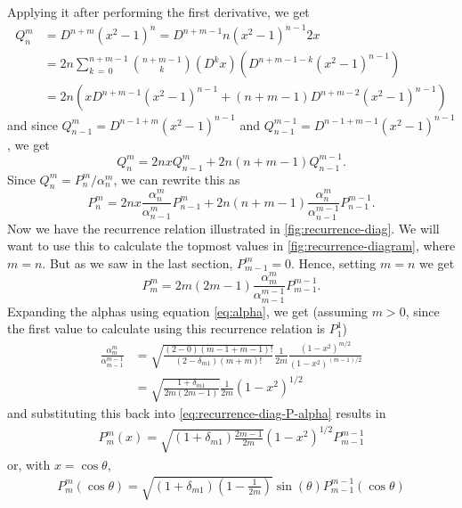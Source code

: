 \documentclass[12pt]{article}
\begin{document}
Applying it after performing the first derivative, we get
\begin{align}
  Q_n^m &= D^{n+m}(x^2 - 1)^n = D^{n + m - 1}n(x^2 - 1)^{n-1}2x\\ 
  &= 2n\sum_{k\,=\,0}^{n+m-1}{n+m-1\choose k}\left(D^k x\right)\left(D^{n+m-1-k}(x^2 - 1)^{n-1}\right)\\ 
  &= 2n\left(xD^{n+m-1}(x^2 - 1)^{n-1} + (n+m-1)D^{n+m-2}(x^2-1)^{n-1}\right)
\end{align}
and since $Q_{n-1}^{m} = D^{n-1+m}(x^2-1)^{n-1}$ and $Q_{n-1}^{m-1}=D^{n-1+m-1}(x^2-1)^{n-1}$, we get
\begin{equation}\label{eq:recurrence-diag-Q}
  Q_n^m = 2nxQ_{n-1}^m + 2n(n+m-1)Q_{n-1}^{m-1}.
\end{equation}
Since $Q_n^m=P_n^m/\alpha_n^m$, we can rewrite this as 
\begin{equation}
  P_n^m = 2nx\frac{\alpha_n^m}{\alpha_{n-1}^m}P_{n-1}^m + 2n(n+m-1)\frac{\alpha_n^m}{\alpha_{n-1}^{m-1}}P_{n-1}^{m-1}.
\end{equation}
Now we have the recurrence relation illustrated in \autoref{fig:recurrence-diag}. We will want to use this to calculate the topmost values in \autoref{fig:recurrence-diagram}, where $m=n$. But as we saw in the last section, $P_{m-1}^m = 0$. Hence, setting $m = n$ we get 
\begin{equation}\label{eq:recurrence-diag-P-alpha}
  P_m^m = 2m(2m-1)\frac{\alpha_m^m}{\alpha_{m-1}^{m-1}}P_{m-1}^{m-1}.
\end{equation}
Expanding the alphas using equation \eqref{eq:alpha}, we get (assuming $m>0$, since the first value to calculate using this recurrence relation is $P_1^1$)
\begin{align}
  \frac{\alpha_m^m}{\alpha_{m-1}^{m-1}} &= \sqrt{\frac{(2-0)(m-1+m-1)!}{(2-\delta_{m1})(m+m)!}}\frac{1}{2m}\frac{(1-x^2)^{m/2}}{(1-x^2)^{(m-1)/2}}\\ 
                                        &= \sqrt{\frac{1+\delta_{m1}}{2m(2m-1)}}\frac{1}{2m}(1-x^2)^{1/2}
\end{align}
and substituting this back into \eqref{eq:recurrence-diag-P-alpha} results in
\begin{align}
  P_m^m(x) = \sqrt{(1+\delta_{m1})\frac{2m-1}{2m}}(1-x^2)^{1/2}P_{m-1}^{m-1}
\end{align}
or, with $x=\cos\theta$,
\begin{align}
  \boxed{P_m^m(\cos\theta) = \sqrt{(1+\delta_{m1})\left(1-\frac{1}{2m}\right)}\sin(\theta) P_{m-1}^{m-1}(\cos\theta)}
\end{align}
\end{document}
